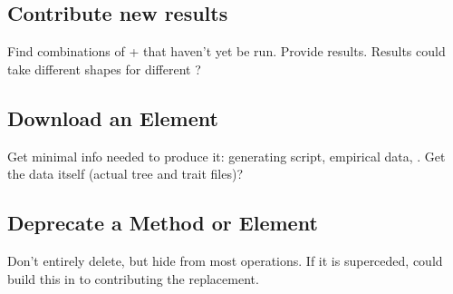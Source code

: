 \subsection{Contribute new \Performance results}
\label{sec:workflow_performance}

Find combinations of \Method + \Element that haven't yet be run.
Provide \Performance results.
Results could take different shapes for different \Tasks?

\subsection{Download an Element}

Get minimal info needed to produce it: generating script, empirical data, \etc.
Get the data itself (actual tree and trait files)?

\subsection{Deprecate a Method or Element}

Don't entirely delete, but hide from most operations.
If it is superceded, could build this in to contributing the replacement.
